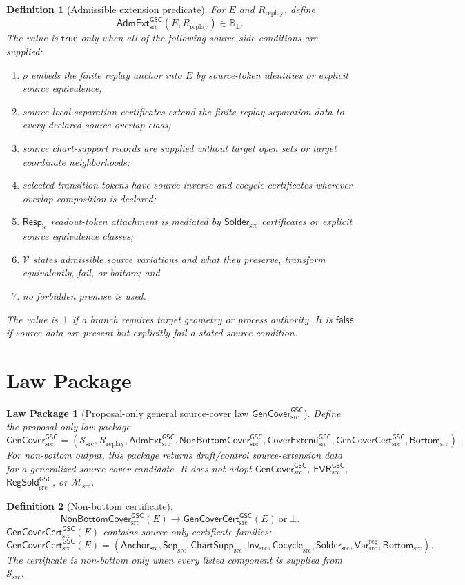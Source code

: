 \documentclass[11pt]{article}
\newcommand{\RespLC}{\mathsf{Resp}_{\mathrm{lc}}}
\newcommand{\Msrc}{\mathcal{M}_{\mathrm{src}}}
\newcommand{\RegSold}{\mathsf{RegSold}_{\mathrm{src}}^{\mathsf{GSC}}}
\newcommand{\FVRSrc}{\mathsf{FVR}_{\mathrm{src}}^{\mathsf{GSC}}}
\newcommand{\GenCover}{\mathsf{GenCover}_{\mathrm{src}}^{\mathsf{GSC}}}
\newcommand{\AdmExt}{\mathsf{AdmExt}_{\mathrm{src}}^{\mathsf{GSC}}}
\newcommand{\CoverExt}{\mathsf{CoverExtend}_{\mathrm{src}}^{\mathsf{GSC}}}
\newcommand{\NonBottom}{\mathsf{NonBottomCover}_{\mathrm{src}}^{\mathsf{GSC}}}
\newcommand{\Cert}{\mathsf{GenCoverCert}_{\mathrm{src}}^{\mathsf{GSC}}}
\newcommand{\Anchor}{\mathsf{Anchor}_{\mathrm{src}}}
\newcommand{\BottomSrc}{\mathsf{Bottom}_{\mathrm{src}}}
\newcommand{\SepSrc}{\mathsf{Sep}_{\mathrm{src}}}
\newcommand{\ChartSuppSrc}{\mathsf{ChartSupp}_{\mathrm{src}}}
\newcommand{\SolderSrc}{\mathsf{Solder}_{\mathrm{src}}}
\newcommand{\VarRegSrc}{\mathsf{Var}^{\mathrm{reg}}_{\mathrm{src}}}
\newcommand{\Bot}{\bot}
\newtheorem{definition}{Definition}
\newtheorem{law}{Law Package}
\begin{document}
\begin{definition}[Admissible extension predicate]
For \(E\) and \(R_{\mathrm{replay}}\), define
\[
  \AdmExt(E,R_{\mathrm{replay}})\in\mathbb{B}_{\Bot}.
\]
The value is \(\mathsf{true}\) only when all of the following source-side
conditions are supplied:
\begin{enumerate}
  \item \(\rho\) embeds the finite replay anchor into \(E\) by source-token
        identities or explicit source equivalence;
  \item source-local separation certificates extend the finite replay
        separation data to every declared source-overlap class;
  \item source chart-support records are supplied without target open sets or
        target coordinate neighborhoods;
  \item selected transition tokens have source inverse and cocycle
        certificates wherever overlap composition is declared;
  \item \(\RespLC\) readout-token attachment is mediated by
        \(\SolderSrc\) certificates or explicit source equivalence classes;
  \item \(\mathcal{V}\) states admissible source variations and what they
        preserve, transform equivalently, fail, or bottom; and
  \item no forbidden premise is used.
\end{enumerate}
The value is \(\Bot\) if a branch requires target geometry or process
authority. It is \(\mathsf{false}\) if source data are present but explicitly
fail a stated source condition.
\end{definition}

\section{Law Package}

\begin{law}[Proposal-only general source-cover law \(\GenCover\)]
Define the proposal-only law package
\[
  \GenCover =
  (
    \mathcal{S}_{\mathrm{src}},
    R_{\mathrm{replay}},
    \AdmExt,
    \NonBottom,
    \CoverExt,
    \Cert,
    \BottomSrc
  ).
\]
For non-bottom output, this package returns draft/control source-extension
data for a generalized source-cover candidate. It does not adopt
\(\GenCover\), \(\FVRSrc\), \(\RegSold\), or \(\Msrc\).
\end{law}

\begin{definition}[Non-bottom certificate]
\[
  \NonBottom(E) \longrightarrow \Cert(E)\ \text{or}\ \Bot .
\]
\(\Cert(E)\) contains source-only certificate families:
\[
  \Cert(E)=
  (
    \Anchor,
    \SepSrc,
    \ChartSuppSrc,
    \mathsf{Inv}_{\mathrm{src}},
    \mathsf{Cocycle}_{\mathrm{src}},
    \SolderSrc,
    \VarRegSrc,
    \BottomSrc
  ).
\]
The certificate is non-bottom only when every listed component is supplied
from \(\mathcal{S}_{\mathrm{src}}\).
\end{definition}
\end{document}
